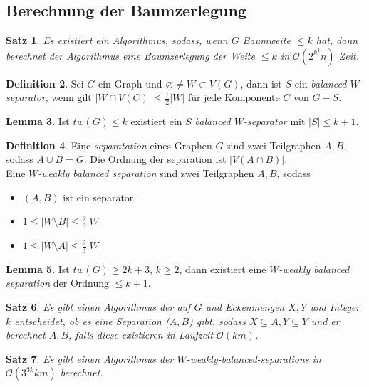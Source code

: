 \documentclass[a4paper, 12pt]{article}
\theoremstyle{plain}
\newtheorem{theorem}{Satz}[subsection] %
\theoremstyle{definition}
\newtheorem{definition}[theorem]{Definition} %
\theoremstyle{lemma}
\newtheorem{lemma}[theorem]{Lemma}
\theoremstyle{remark}
\theoremstyle{corollary}
\theoremstyle{example}
\begin{document}
	\subsection{Berechnung der Baumzerlegung}
	\begin{theorem}
		Es existiert ein Algorithmus, sodass, wenn $G$ Baumweite $\leq k$ hat, dann berechnet der Algorithmus eine Baumzerlegung der Weite $\leq k$ in $\mathcal{O}(2^{k^3}n)$ Zeit.
	\end{theorem}
	\begin{definition}
		Sei $G$ ein Graph und $\varnothing\neq W\subset V(G)$, dann ist $S$ ein \textit{balanced $W$-separator}, wenn gilt $\left|W \cap V(C)\right| \leq \frac{1}{2}\left|W\right|$ für jede Komponente $C$ von $G-S$.
	\end{definition}
	\begin{lemma}
		Ist $tw(G)\leq k$ existiert ein $S$ \textit{balanced $W$-separator} mit $\left|S\right| \leq k+1$.
	\end{lemma}
	\begin{definition}
		Eine \textit{separatation} eines Graphen $G$ sind zwei Teilgraphen $A,B$, sodass $A\cup B = G$. Die Ordnung der separation ist $\left|V(A\cap B)\right|$.\\
		Eine \textit{$W$-weakly balanced separation} sind zwei Teilgraphen $A,B$, sodass \begin{itemize}
			\item $(A,B)$ ist ein separator
			\item $1\leq \left|W\setminus B\right| \leq \frac{2}{3} \left|W\right|$
			\item $1\leq \left|W\setminus A\right| \leq \frac{2}{3} \left|W\right|$
		\end{itemize}
	\end{definition}
	\begin{lemma}
		Ist $tw(G)\geq 2k+3$, $k\geq 2$, dann existiert eine \textit{$W$-weakly balanced separation} der Ordnung $\leq k+1$.
	\end{lemma}
	\begin{theorem}
		Es gibt einen Algorithmus der auf $G$ und Eckenmengen $X,Y$ und Integer $k$ entscheidet, ob es eine Separation ($A,B$) gibt, sodass $X\subseteq A, Y \subseteq Y$ und er berechnet $A,B$, falls diese existieren in Laufzeit $\mathcal{O}(km)$.
	\end{theorem}
	\begin{theorem}
		Es gibt einen Algorithmus der \textit{$W$-weakly-balanced-separations} in $\mathcal{O}(3^{3k}km)$ berechnet. 
	\end{theorem}
\end{document}

